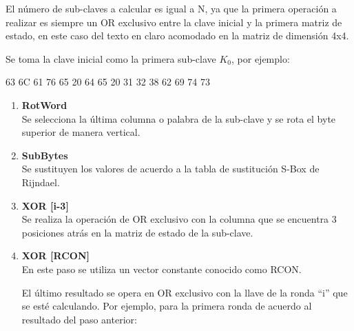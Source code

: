 \documentclass[../main/main.tex]{subfiles}
\begin{document}
      El número de sub-claves a calcular es igual a N, ya que la primera operación a realizar es siempre un OR exclusivo entre la clave inicial y la primera matriz de estado, en este caso del texto en claro acomodado en la matriz de dimensión 4x4.

      Se toma la clave inicial como la primera sub-clave $K_0$, por ejemplo:

      \begin{center}
        63 6C 61 76 65 20 64 65 20 31 32 38 62 69 74 73
      \end{center}

      \begin{enumerate}[label=\textbf{\arabic*}.]
        \item \textbf{RotWord} \\
          Se selecciona la última columna o palabra de la sub-clave y se rota el byte superior de manera vertical.
    
          \begin{table}[H]
            \centering
            
          \end{table}
    
        \item \textbf{SubBytes} \\
          Se sustituyen los valores de acuerdo a la tabla de sustitución S-Box de Rijndael.

          
    
        \item \textbf{XOR [i-3]} \\
          Se realiza la operación de OR exclusivo con la columna que se encuentra 3 posiciones atrás en la matriz de estado de la sub-clave.
    
          

        \item \textbf{XOR [RCON]} \\
          En este paso se utiliza un vector constante conocido como RCON.
          
          

          El último resultado se opera en OR exclusivo con la llave de la ronda “i” que se esté calculando. Por ejemplo, para la primera ronda de acuerdo al resultado del paso anterior:
    
          


\end{enumerate}
\end{document}
